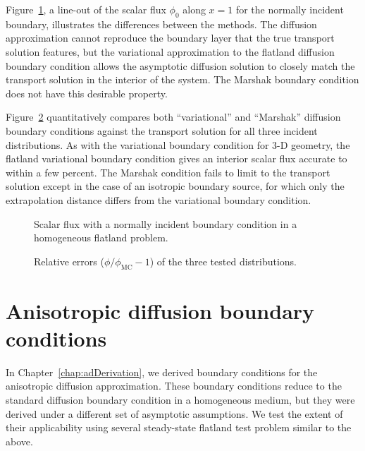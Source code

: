 Figure~\ref{fig:flatlandBcDelta},
 a line-out of the scalar flux $\phi_0$ along
$x=1$ for the normally incident boundary, illustrates the differences between
the methods. The diffusion
approximation cannot reproduce the boundary layer that the true transport
solution features, but the variational approximation to the flatland
diffusion boundary condition allows the asymptotic diffusion solution to
closely match the transport solution in the interior of the system. The Marshak
boundary condition does not have this desirable property.

Figure~\ref{fig:flatlandBcRelative} quantitatively compares both ``variational'' and
``Marshak'' diffusion boundary conditions against the transport solution
for all three incident distributions.  
As with the variational boundary condition for 3-D geometry, the flatland
variational boundary condition gives an interior scalar flux accurate to within
a few percent. The Marshak condition fails to limit to the transport solution except in
the case of an isotropic boundary source, for which only the extrapolation
distance differs from the variational boundary condition.

\begin{figure}[tb]
  \centering\small
  \hspace{-.25in}%
  
  \caption{Scalar flux with a normally incident boundary condition in a
  homogeneous flatland problem.}
  \label{fig:flatlandBcDelta}
\end{figure}
 
\begin{figure}[tb]
  \centering\small
  \hspace{-.25in}%
  
  \caption{Relative errors ($\phi/\phi_\text{MC} - 1$) of the three tested
  distributions.}
  \label{fig:flatlandBcRelative}
\end{figure}

\section{Anisotropic diffusion boundary conditions}

In Chapter~\ref{chap:adDerivation}, we derived boundary conditions for the
anisotropic diffusion approximation. These boundary conditions reduce to the
standard diffusion boundary condition in a homogeneous medium, but they were
derived under a different set of asymptotic assumptions. We test the extent of
their applicability using several steady-state flatland test problem similar to
the above.

